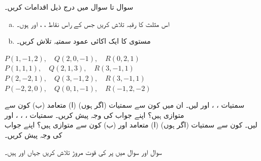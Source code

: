 سوال  تا سوال  میں درج ذیل اقدامات  کریں۔
\begin{enumerate}[a.]
\item
اس مثلث کا رقبہ تلاش کریں جس کے راس نقاط ،   ، اور  ہوں۔
\item
مستوی  کا ایک اکائی عمود سمتیہ تلاش کریں۔
\end{enumerate}

$P(1,-1,2),\quad Q(2,0,-1),\quad R(0,2,1)$
$P(1,1,1),\quad Q(2,1,3),\quad R(3,-1,1)$
$P(2,-2,1),\quad Q(3,-1,2),\quad R(3,-1,1)$
$P(-2,2,0),\quad Q(0,1,-1),\quad R(-1,2,-2)$

سمتیات ، ،  اور  لیں۔ ان میں کون سے سمتیات (اگر ہوں) (ا) متعامد (ب) کون سے متوازی ہیں؟  اپنے جواب کی وجہ پیش کریں۔
سمتیات ، ، ،  اور\\
  لیں۔ کون سے سمتیات (اگر ہوں) (ا) متعامد اور (ب) کون سے متوازی ہیں؟ اپنے جواب کی وجہ پیش کریں۔

سوال  اور سوال  میں  پر  کی  قوت مروڑ تلاش کریں جہاں  اور  ہیں۔

